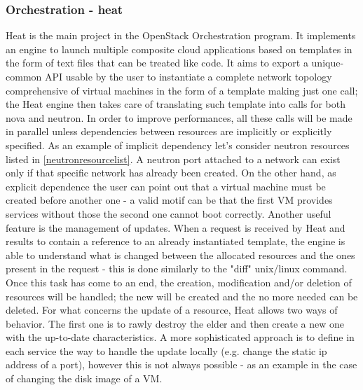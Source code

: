 \subsubsection{Orchestration - heat}
Heat is the main project in the OpenStack Orchestration program. It implements an engine to launch multiple composite cloud applications based on templates in the form of text files that can be treated like code. It aims to export a unique-common API usable by the user to instantiate a complete network topology comprehensive of virtual machines in the form of a template making just one call; the Heat engine then takes care of translating such template into calls for both nova and neutron. In order to improve performances, all these calls will be made in parallel unless dependencies between resources are implicitly or explicitly specified. As an example of implicit dependency let's consider neutron resources listed in \ref{neutronresourcelist}.
A neutron port attached to a network can exist only if that specific network has already been created.
On the other hand, as explicit dependence the user can point out that a virtual machine must be created before another one - a valid motif can be that the first VM provides services without those the second one cannot boot correctly.
Another useful feature is the management of updates.
When a request is received by Heat and results to contain a reference to an already instantiated template, the engine is able to understand what is changed between the allocated resources and the ones present in the request - this is done similarly to the "diff" unix/linux command.
Once this task has come to an end, the creation, modification and/or deletion of resources will be handled; the new will be created and the no more needed can be deleted.
For what concerns the update of a resource, Heat allows two ways of behavior. The first one is to rawly destroy the elder and then create a new one with the up-to-date characteristics. A more sophisticated approach is to define in each service the way to handle the update locally (e.g. change the static ip address of a port), however this is not always possible - as an example in the case of changing the disk image of a VM.


